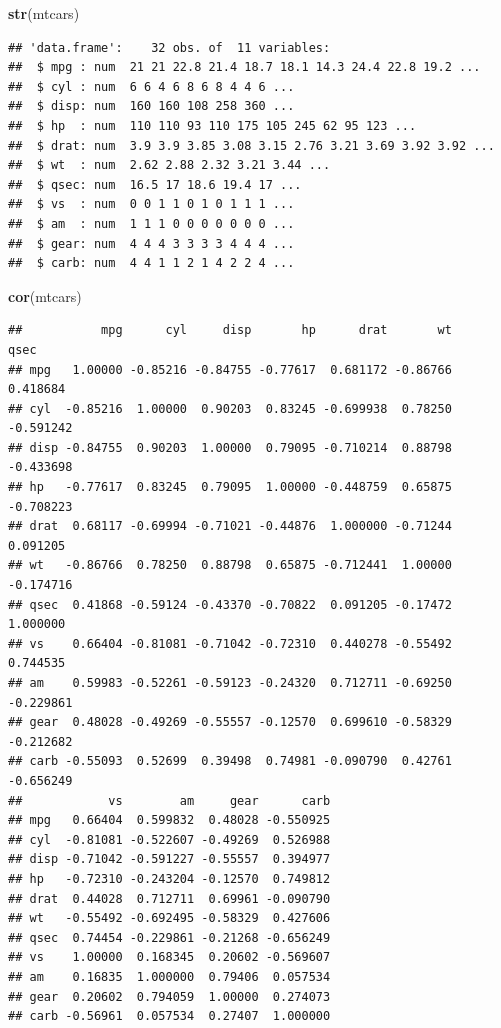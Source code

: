 \documentclass[]{article}
\newenvironment{Shaded}{\begin{snugshade}}{\end{snugshade}}
\newcommand{\KeywordTok}[1]{\textcolor[rgb]{0.13,0.29,0.53}{\textbf{{#1}}}}
\newcommand{\NormalTok}[1]{{#1}}
\begin{document}
\begin{Shaded}
\begin{Highlighting}[]
\KeywordTok{str}\NormalTok{(mtcars)}
\end{Highlighting}
\end{Shaded}

\begin{verbatim}
## 'data.frame':    32 obs. of  11 variables:
##  $ mpg : num  21 21 22.8 21.4 18.7 18.1 14.3 24.4 22.8 19.2 ...
##  $ cyl : num  6 6 4 6 8 6 8 4 4 6 ...
##  $ disp: num  160 160 108 258 360 ...
##  $ hp  : num  110 110 93 110 175 105 245 62 95 123 ...
##  $ drat: num  3.9 3.9 3.85 3.08 3.15 2.76 3.21 3.69 3.92 3.92 ...
##  $ wt  : num  2.62 2.88 2.32 3.21 3.44 ...
##  $ qsec: num  16.5 17 18.6 19.4 17 ...
##  $ vs  : num  0 0 1 1 0 1 0 1 1 1 ...
##  $ am  : num  1 1 1 0 0 0 0 0 0 0 ...
##  $ gear: num  4 4 4 3 3 3 3 4 4 4 ...
##  $ carb: num  4 4 1 1 2 1 4 2 2 4 ...
\end{verbatim}

\begin{Shaded}
\begin{Highlighting}[]
\KeywordTok{cor}\NormalTok{(mtcars)}
\end{Highlighting}
\end{Shaded}

\begin{verbatim}
##           mpg      cyl     disp       hp      drat       wt      qsec
## mpg   1.00000 -0.85216 -0.84755 -0.77617  0.681172 -0.86766  0.418684
## cyl  -0.85216  1.00000  0.90203  0.83245 -0.699938  0.78250 -0.591242
## disp -0.84755  0.90203  1.00000  0.79095 -0.710214  0.88798 -0.433698
## hp   -0.77617  0.83245  0.79095  1.00000 -0.448759  0.65875 -0.708223
## drat  0.68117 -0.69994 -0.71021 -0.44876  1.000000 -0.71244  0.091205
## wt   -0.86766  0.78250  0.88798  0.65875 -0.712441  1.00000 -0.174716
## qsec  0.41868 -0.59124 -0.43370 -0.70822  0.091205 -0.17472  1.000000
## vs    0.66404 -0.81081 -0.71042 -0.72310  0.440278 -0.55492  0.744535
## am    0.59983 -0.52261 -0.59123 -0.24320  0.712711 -0.69250 -0.229861
## gear  0.48028 -0.49269 -0.55557 -0.12570  0.699610 -0.58329 -0.212682
## carb -0.55093  0.52699  0.39498  0.74981 -0.090790  0.42761 -0.656249
##            vs        am     gear      carb
## mpg   0.66404  0.599832  0.48028 -0.550925
## cyl  -0.81081 -0.522607 -0.49269  0.526988
## disp -0.71042 -0.591227 -0.55557  0.394977
## hp   -0.72310 -0.243204 -0.12570  0.749812
## drat  0.44028  0.712711  0.69961 -0.090790
## wt   -0.55492 -0.692495 -0.58329  0.427606
## qsec  0.74454 -0.229861 -0.21268 -0.656249
## vs    1.00000  0.168345  0.20602 -0.569607
## am    0.16835  1.000000  0.79406  0.057534
## gear  0.20602  0.794059  1.00000  0.274073
## carb -0.56961  0.057534  0.27407  1.000000
\end{verbatim}
\end{document}
